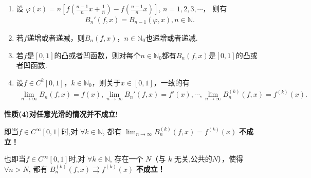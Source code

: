 \documentclass[../../main.tex]{subfiles}%
\begin{document}
\begin{theorem}[Bernstein多项式的性质]\label{theorem:Bernstein多项式的性质}
\begin{enumerate}[(1)]
\item 设
\(\varphi(x)=n\left[f\left(\frac{n - 1}{n}x+\frac{1}{n}\right)-f\left(\frac{n - 1}{n}x\right)\right]\), \(n = 1,2,3,\cdots\)，
则有
\begin{align}\label{equation--Bernstein多项式性质13.115}
B_n'(f,x)=B_{n - 1}(\varphi,x),n\in\mathbb{N}.
\end{align}

\item 若\(f\)递增或者递减，则\(B_n(f,x)\)，\(n\in\mathbb{N}_0\)也递增或者递减.

\item 若\(f\)是\([0,1]\)的凸或者凹函数，则对每个\(n\in\mathbb{N}_0\)都有\(B_n(f,x)\)是\([0,1]\)的凸或者凹函数.

\item 设\(f\in C^k[0,1]\)，\(k\in\mathbb{N}_0\)，则关于\(x\in[0,1]\)，一致的有
\begin{align}\label{equation--Bernstein多项式性质13.116}
\lim_{n\rightarrow\infty}B_n(f,x)=f(x),\lim_{n\rightarrow\infty}B_n'(f,x)=f'(x),\cdots,\lim_{n\rightarrow\infty}B_n^{(k)}(f,x)=f^{(k)}(x).
\end{align}
\end{enumerate} 
\end{theorem}
\begin{remark}
\textbf{性质(4)对任意光滑的情况并不成立!}

即当$f\in C^{\infty}[0,1]$时,对 $\forall k\in \mathbb{N}$, 都有 $\lim_{n\rightarrow \infty}B_{n}^{( k )}( f,x ) =f^{( k )}( x )$ \textbf{不成立！}

也即当$f\in C^{\infty}[0,1]$时,对 $\forall k\in \mathbb{N}$, 存在一个 $N$（与 $k$ 无关,公共的$N$），使得 $\forall n>N$, 都有 $B_{n}^{( k )}( f,x ) \rightrightarrows f^{( k )}( x )$ \textbf{不成立！}
\end{remark}
\end{document}
